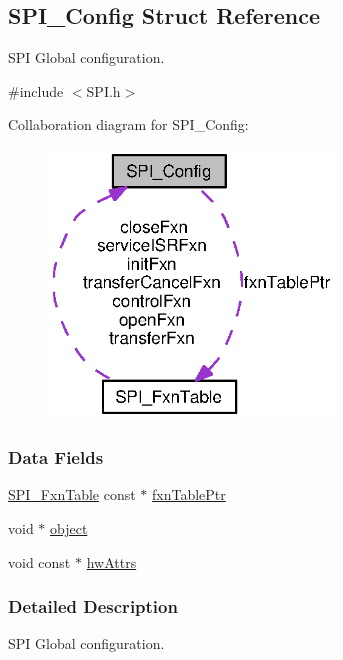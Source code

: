 \subsection{S\+P\+I\+\_\+\+Config Struct Reference}
\label{struct_s_p_i___config}


S\+P\+I Global configuration.  




{\ttfamily \#include $<$S\+P\+I.\+h$>$}



Collaboration diagram for S\+P\+I\+\_\+\+Config\+:
\nopagebreak
\begin{figure}[H]
\begin{center}
\leavevmode
\includegraphics[width=215pt]{struct_s_p_i___config__coll__graph}
\end{center}
\end{figure}
\subsubsection*{Data Fields}
\begin{DoxyCompactItemize}
\item 
\hyperlink{struct_s_p_i___fxn_table}{S\+P\+I\+\_\+\+Fxn\+Table} const $\ast$ \hyperlink{struct_s_p_i___config_a099238ad6e5c2ca2d38f041624362636}{fxn\+Table\+Ptr}
\item 
void $\ast$ \hyperlink{struct_s_p_i___config_a35884e199911642a791e9a422dfccba6}{object}
\item 
void const $\ast$ \hyperlink{struct_s_p_i___config_a4c8bfac4e9152b4e1da78f4926ecd4db}{hw\+Attrs}
\end{DoxyCompactItemize}


\subsubsection{Detailed Description}
S\+P\+I Global configuration. 

